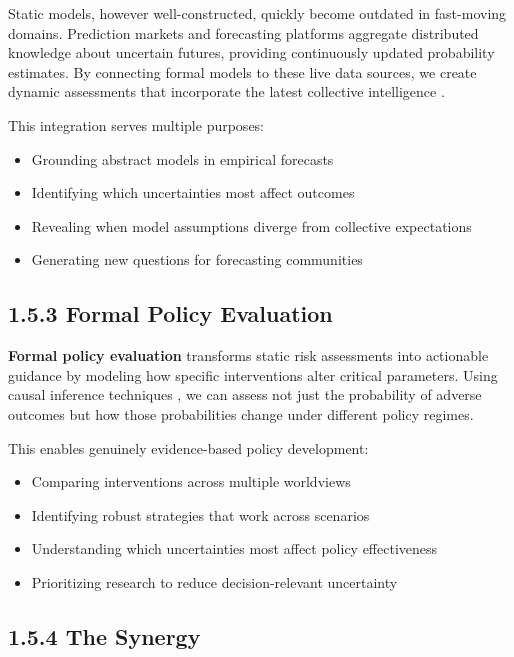 \documentclass[
  11pt,
  letterpaper,
  openany]{book}
\providecommand{\tightlist}{%
  \setlength{\itemsep}{0pt}\setlength{\parskip}{0pt}}
\begin{document}
Static models, however well-constructed, quickly become outdated in
fast-moving domains. Prediction markets and forecasting platforms
aggregate distributed knowledge about uncertain futures, providing
continuously updated probability estimates. By connecting formal models
to these live data sources, we create dynamic assessments that
incorporate the latest collective intelligence \textcite{tetlock2015}.

This integration serves multiple purposes:

\begin{itemize}
\tightlist
\item
  Grounding abstract models in empirical forecasts
\item
  Identifying which uncertainties most affect outcomes
\item
  Revealing when model assumptions diverge from collective expectations
\item
  Generating new questions for forecasting communities
\end{itemize}

\subsection{1.5.3 Formal Policy
Evaluation}\label{formal-policy-evaluation}

\textbf{Formal policy evaluation} transforms static risk assessments
into actionable guidance by modeling how specific interventions alter
critical parameters. Using causal inference techniques
\textcite{pearl2000} \textcite{pearl2009}, we can assess not just the
probability of adverse outcomes but how those probabilities change under
different policy regimes.

This enables genuinely evidence-based policy development:

\begin{itemize}
\tightlist
\item
  Comparing interventions across multiple worldviews
\item
  Identifying robust strategies that work across scenarios
\item
  Understanding which uncertainties most affect policy effectiveness
\item
  Prioritizing research to reduce decision-relevant uncertainty
\end{itemize}

\subsection{1.5.4 The Synergy}\label{the-synergy}
\end{document}
